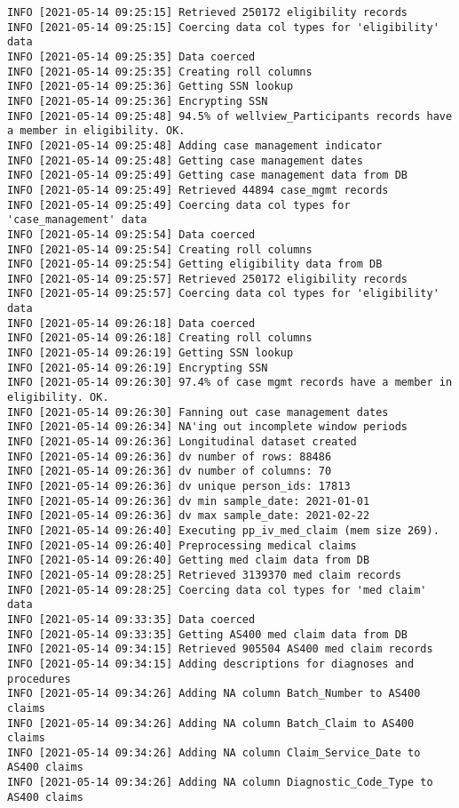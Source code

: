 \documentclass[
]{book}
\begin{document}
\begin{verbatim}
INFO [2021-05-14 09:25:15] Retrieved 250172 eligibility records
INFO [2021-05-14 09:25:15] Coercing data col types for 'eligibility' data
INFO [2021-05-14 09:25:35] Data coerced
INFO [2021-05-14 09:25:35] Creating roll columns
INFO [2021-05-14 09:25:36] Getting SSN lookup
INFO [2021-05-14 09:25:36] Encrypting SSN
INFO [2021-05-14 09:25:48] 94.5% of wellview_Participants records have a member in eligibility. OK.
INFO [2021-05-14 09:25:48] Adding case management indicator
INFO [2021-05-14 09:25:48] Getting case management dates
INFO [2021-05-14 09:25:49] Getting case management data from DB
INFO [2021-05-14 09:25:49] Retrieved 44894 case_mgmt records
INFO [2021-05-14 09:25:49] Coercing data col types for 'case_management' data
INFO [2021-05-14 09:25:54] Data coerced
INFO [2021-05-14 09:25:54] Creating roll columns
INFO [2021-05-14 09:25:54] Getting eligibility data from DB
INFO [2021-05-14 09:25:57] Retrieved 250172 eligibility records
INFO [2021-05-14 09:25:57] Coercing data col types for 'eligibility' data
INFO [2021-05-14 09:26:18] Data coerced
INFO [2021-05-14 09:26:18] Creating roll columns
INFO [2021-05-14 09:26:19] Getting SSN lookup
INFO [2021-05-14 09:26:19] Encrypting SSN
INFO [2021-05-14 09:26:30] 97.4% of case mgmt records have a member in eligibility. OK.
INFO [2021-05-14 09:26:30] Fanning out case management dates
INFO [2021-05-14 09:26:34] NA'ing out incomplete window periods
INFO [2021-05-14 09:26:36] Longitudinal dataset created
INFO [2021-05-14 09:26:36] dv number of rows: 88486
INFO [2021-05-14 09:26:36] dv number of columns: 70
INFO [2021-05-14 09:26:36] dv unique person_ids: 17813
INFO [2021-05-14 09:26:36] dv min sample_date: 2021-01-01
INFO [2021-05-14 09:26:36] dv max sample_date: 2021-02-22
INFO [2021-05-14 09:26:40] Executing pp_iv_med_claim (mem size 269).
INFO [2021-05-14 09:26:40] Preprocessing medical claims
INFO [2021-05-14 09:26:40] Getting med claim data from DB
INFO [2021-05-14 09:28:25] Retrieved 3139370 med claim records
INFO [2021-05-14 09:28:25] Coercing data col types for 'med claim' data
INFO [2021-05-14 09:33:35] Data coerced
INFO [2021-05-14 09:33:35] Getting AS400 med claim data from DB
INFO [2021-05-14 09:34:15] Retrieved 905504 AS400 med claim records
INFO [2021-05-14 09:34:15] Adding descriptions for diagnoses and procedures
INFO [2021-05-14 09:34:26] Adding NA column Batch_Number to AS400 claims
INFO [2021-05-14 09:34:26] Adding NA column Batch_Claim to AS400 claims
INFO [2021-05-14 09:34:26] Adding NA column Claim_Service_Date to AS400 claims
INFO [2021-05-14 09:34:26] Adding NA column Diagnostic_Code_Type to AS400 claims

\end{verbatim}
\end{document}
